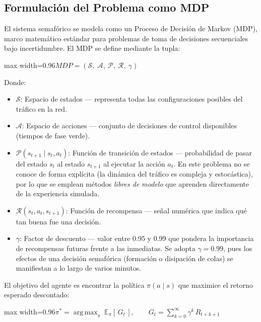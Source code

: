 \documentclass[12pt,a4paper,oneside]{report}
\newenvironment{centeredmath}
  {\begin{center}\begin{adjustbox}{max width=0.96\linewidth}\(\displaystyle}
  {\)\end{adjustbox}\end{center}}
\begin{document}
\subsection{Formulación del Problema como MDP}\label{formulaciuxf3n-del-problema-como-mdp}

El sistema semafórico se modela como un Proceso de Decisión de Markov (MDP), marco matemático estándar para problemas de toma de decisiones secuenciales bajo incertidumbre. El MDP se define mediante la tupla:

\begin{centeredmath}
MDP = (\mathcal{S},\ \mathcal{A},\ \mathcal{P},\ \mathcal{R},\ \gamma)
\end{centeredmath}

Donde:

\begin{itemize}
\item
  \(\mathcal{S}\): Espacio de estados --- representa todas las configuraciones posibles del tráfico en la red.
\item
  \(\mathcal{A}\): Espacio de acciones --- conjunto de decisiones de control disponibles (tiempos de fase verde).
\item
  \(\mathcal{P}(s_{t+1} \mid s_{t}, a_{t})\): Función de transición de estados --- probabilidad de pasar del estado \(s_{t}\) al estado \(s_{t+1}\) al ejecutar la acción \(a_{t}\). En este problema no se conoce de forma explícita (la dinámica del tráfico es compleja y estocástica), por lo que se emplean métodos \emph{libres de modelo} que aprenden directamente de la experiencia simulada.
\item
  \(\mathcal{R}(s_{t}, a_{t}, s_{t+1})\): Función de recompensa --- señal numérica que indica qué tan buena fue una decisión.
\item
  \(\gamma\): Factor de descuento --- valor entre 0.95 y 0.99 que pondera la importancia de recompensas futuras frente a las inmediatas. Se adopta \(\gamma = 0.99\), pues los efectos de una decisión semafórica (formación o disipación de colas) se manifiestan a lo largo de varios minutos.
\end{itemize}

El objetivo del agente es encontrar la política \(\pi(a \mid s)\) que maximice el retorno esperado descontado:

\begin{centeredmath}
\pi^{*} = \operatorname*{arg\,max}_{\pi}\ \mathbb{E}_{\pi}\!\left[\, G_{t} \,\right], \qquad
G_{t} = \sum_{k = 0}^{\infty}\gamma^{k}\, R_{t + k + 1}
\end{centeredmath}
\end{document}
